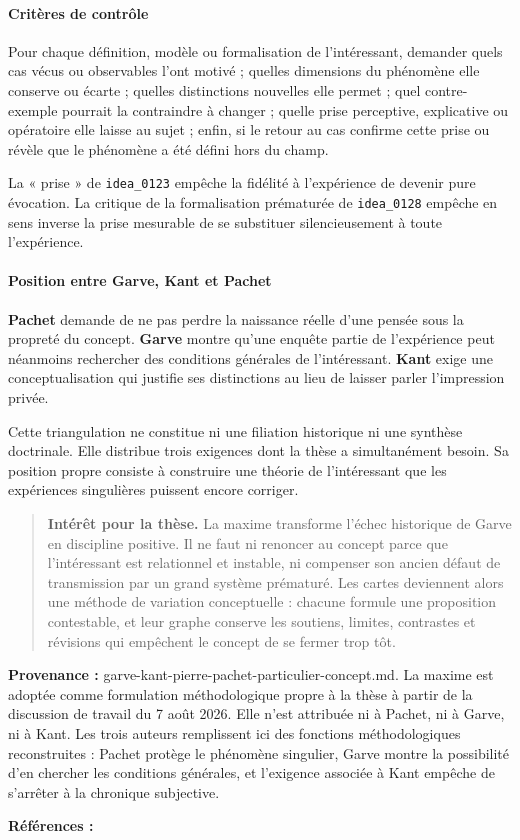 \documentclass[10pt,a4paper]{article}
\begin{document}
\paragraph{Critères de contrôle}
Pour chaque définition, modèle ou formalisation de l'intéressant, demander quels cas vécus ou observables l'ont motivé ; quelles dimensions du phénomène elle conserve ou écarte ; quelles distinctions nouvelles elle permet ; quel contre-exemple pourrait la contraindre à changer ; quelle prise perceptive, explicative ou opératoire elle laisse au sujet ; enfin, si le retour au cas confirme cette prise ou révèle que le phénomène a été défini hors du champ.

La « prise » de \texttt{idea\_0123} empêche la fidélité à l'expérience de devenir pure évocation. La critique de la formalisation prématurée de \texttt{idea\_0128} empêche en sens inverse la prise mesurable de se substituer silencieusement à toute l'expérience.

\paragraph{Position entre Garve, Kant et Pachet}
\textbf{Pachet} demande de ne pas perdre la naissance réelle d'une pensée sous la propreté du concept. \textbf{Garve} montre qu'une enquête partie de l'expérience peut néanmoins rechercher des conditions générales de l'intéressant. \textbf{Kant} exige une conceptualisation qui justifie ses distinctions au lieu de laisser parler l'impression privée.

Cette triangulation ne constitue ni une filiation historique ni une synthèse doctrinale. Elle distribue trois exigences dont la thèse a simultanément besoin. Sa position propre consiste à construire une théorie de l'intéressant que les expériences singulières puissent encore corriger.

\begin{quote}
\textbf{Intérêt pour la thèse.} La maxime transforme l'échec historique de Garve en discipline positive. Il ne faut ni renoncer au concept parce que l'intéressant est relationnel et instable, ni compenser son ancien défaut de transmission par un grand système prématuré. Les cartes deviennent alors une méthode de variation conceptuelle : chacune formule une proposition contestable, et leur graphe conserve les soutiens, limites, contrastes et révisions qui empêchent le concept de se fermer trop tôt.
\end{quote}
{\footnotesize\color{metadata}\textbf{Provenance :} garve-kant-pierre-pachet-particulier-concept.md. La maxime est adoptée comme formulation méthodologique propre à la thèse à partir de la discussion de travail du 7 août 2026. Elle n'est attribuée ni à Pachet, ni à Garve, ni à Kant. Les trois auteurs remplissent ici des fonctions méthodologiques reconstruites : Pachet protège le phénomène singulier, Garve montre la possibilité d'en chercher les conditions générales, et l'exigence associée à Kant empêche de s'arrêter à la chronique subjective.\par}
{\footnotesize\color{metadata}\textbf{Références :} \parencite{salgas1991pachet,pachet1999oeuvre,rueff2016promontoire,garve1779interessirende}\par}
\end{document}
